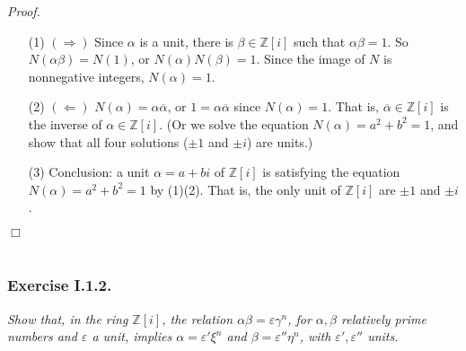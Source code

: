 \documentclass{article}
\begin{document}
\emph{Proof.}
\begin{enumerate}
\item[(1)]
  \emph{$(\Longrightarrow)$}
  Since $\alpha$ is a unit, there is $\beta \in \mathbb{Z}[i]$ such that
  $\alpha \beta = 1$.
  So $N(\alpha \beta) = N(1)$, or $N(\alpha) N(\beta) = 1$.
  Since the image of $N$ is nonnegative integers, $N(\alpha) = 1$.

\item[(2)]
  \emph{$(\Longleftarrow)$}
  $N(\alpha) = \alpha \overline{\alpha}$,
  or $1 = \alpha \overline{\alpha}$ since $N(\alpha) = 1$.
  That is, $\overline{\alpha} \in \mathbb{Z}[i]$ is
  the inverse of $\alpha \in \mathbb{Z}[i]$.
  (Or we solve the equation $N(\alpha) = a^2 + b^2 = 1$,
  and show that all four solutions ($\pm 1$ and $\pm i$) are units.)

\item[(3)]
  Conclusion: a unit $\alpha = a+bi$ of $\mathbb{Z}[i]$
  is satisfying the equation $N(\alpha) = a^2 + b^2 = 1$ by (1)(2).
  That is, the only unit of $\mathbb{Z}[i]$ are $\pm 1$ and $\pm i$.
\end{enumerate}
$\Box$ \\\\






\subsubsection*{Exercise I.1.2.}
\emph{Show that, in the ring $\mathbb{Z}[i]$, the relation $\alpha\beta = \varepsilon\gamma^n$,
for $\alpha,\beta$ relatively prime numbers and $\varepsilon$ a unit,
implies $\alpha = \varepsilon' \xi^n$ and $\beta = \varepsilon'' \eta^n$,
with $\varepsilon', \varepsilon''$ units.} \\
\end{document}
